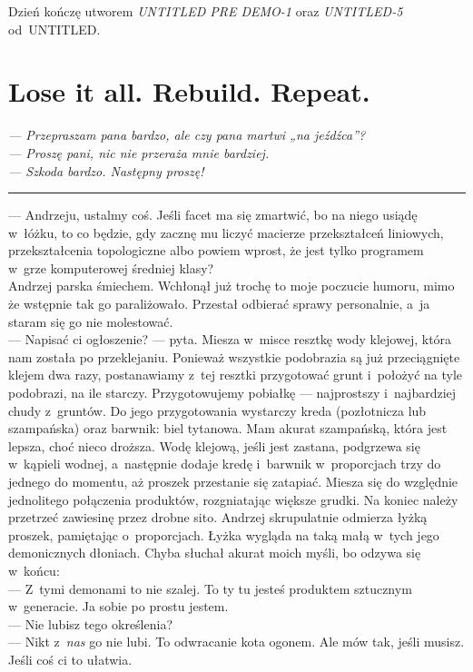 \documentclass[9pt, a5paper]{memoir}
\begin{document}
Dzień kończę utworem \textit{UNTITLED PRE DEMO-1} oraz \textit{UNTITLED-5} od~UNTITLED.

\newpage
\section{Lose it all. Rebuild. Repeat.}
{
\itshape
--- Przepraszam pana bardzo, ale czy pana martwi „na jeźdźca”?\\
--- Proszę pani, nic nie przeraża mnie bardziej.\\
--- Szkoda bardzo. Następny proszę!
}

\fancybreak{* \quad * \quad *}

--- Andrzeju, ustalmy coś. Jeśli facet ma się zmartwić, bo na niego usiądę w~łóżku, to co będzie, gdy zacznę mu liczyć macierze przekształceń liniowych, przekształcenia topologiczne albo powiem wprost, że jest tylko programem w~grze komputerowej średniej klasy?\\
Andrzej parska śmiechem. Wchłonął już trochę to moje poczucie humoru, mimo że wstępnie tak go paraliżowało. Przestał odbierać sprawy personalnie, a~ja staram się go nie molestować.\\
--- Napisać ci ogłoszenie? --- pyta. Miesza w~misce resztkę wody klejowej, która nam została po przeklejaniu. Ponieważ wszystkie podobrazia są już przeciągnięte klejem dwa razy, postanawiamy z~tej resztki przygotować grunt i~położyć na tyle podobrazi, na ile starczy. Przygotowujemy pobiałkę --- najprostszy i~najbardziej chudy z~gruntów. Do jego przygotowania wystarczy kreda (pozłotnicza lub szampańska) oraz barwnik: biel tytanowa. Mam akurat szampańską, która jest lepsza, choć nieco droższa. Wodę klejową, jeśli jest zastana, podgrzewa się w~kąpieli wodnej, a~następnie dodaje kredę i~barwnik w~proporcjach trzy do jednego do momentu, aż proszek przestanie się zatapiać. Miesza się do względnie jednolitego połączenia produktów, rozgniatając większe grudki. Na koniec należy przetrzeć zawiesinę przez drobne sito. Andrzej skrupulatnie odmierza łyżką proszek, pamiętając o~proporcjach. Łyżka wygląda na taką małą w~tych jego demonicznych dłoniach. Chyba słuchał akurat moich myśli, bo odzywa się w~końcu:\\
--- Z~tymi demonami to nie szalej. To ty tu jesteś produktem sztucznym w~generacie. Ja sobie po prostu jestem.\\
--- Nie lubisz tego określenia?\\
--- Nikt z~\textit{nas} go nie lubi. To odwracanie kota ogonem. Ale mów tak, jeśli musisz. Jeśli coś ci to ułatwia.\\
\end{document}
